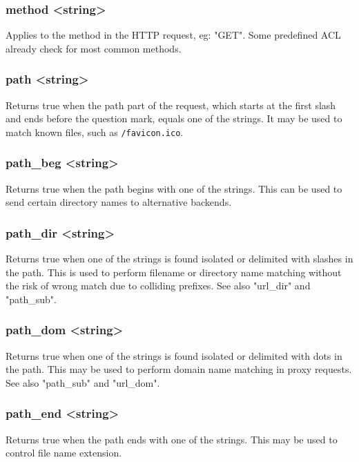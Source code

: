 \subsubsection[method]{method <string>}
  Applies to the method in the HTTP request, eg: "GET". Some predefined ACL
  already check for most common methods.

\subsubsection[path]{path <string>}
  Returns true when the path part of the request, which starts at the first
  slash and ends before the question mark, equals one of the strings. It may be
  used to match known files, such as \verb|/favicon.ico|.

\subsubsection[path\_beg]{path\_beg <string>}
  Returns true when the path begins with one of the strings. This can be used
  to send certain directory names to alternative backends.

\subsubsection[path\_dir]{path\_dir <string>}
  Returns true when one of the strings is found isolated or delimited with
  slashes in the path. This is used to perform filename or directory name
  matching without the risk of wrong match due to colliding prefixes. See also
  "url\_dir" and "path\_sub".

\subsubsection[path\_dom]{path\_dom <string>}
  Returns true when one of the strings is found isolated or delimited with dots
  in the path. This may be used to perform domain name matching in proxy
  requests. See also "path\_sub" and "url\_dom".

\subsubsection[path\_end]{path\_end <string>}
  Returns true when the path ends with one of the strings. This may be used to
  control file name extension.

